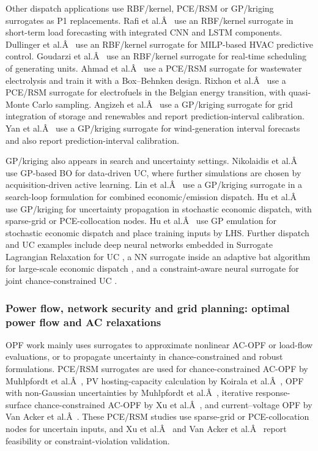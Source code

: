 \documentclass[final,5p,times,twocolumn]{elsarticle}
\begin{document}
Other dispatch applications use RBF/kernel, PCE/RSM or GP/kriging
surrogates as P1 replacements. Rafi et al.Â~\cite{Rafi202132436} use an
RBF/kernel surrogate in short-term load forecasting with integrated CNN
and LSTM components. Dullinger et al.Â~\cite{Dullinger20181646} use an
RBF/kernel surrogate for MILP-based HVAC predictive control. Goudarzi et
al.Â~\cite{Goudarzi2017667} use an RBF/kernel surrogate for real-time
scheduling of generating units. Ahmad et al.Â~\cite{Ahmad202451} use a
PCE/RSM surrogate for wastewater electrolysis and train it with a
Box--Behnken design. Rixhon et al.Â~\cite{Rixhon2021} use a PCE/RSM surrogate
for electrofuels in the Belgian energy transition, with quasi-Monte
Carlo sampling. Angizeh et al.Â~\cite{Angizeh2023134995} use a GP/kriging
surrogate for grid integration of storage and renewables and report
prediction-interval calibration. Yan et al.Â~\cite{Yan2019625} use a
GP/kriging surrogate for wind-generation interval forecasts and also
report prediction-interval calibration.

GP/kriging also appears in search and uncertainty settings. Nikolaidis
et al.Â~\cite{Nikolaidis2021} use GP-based BO for data-driven UC, where
further simulations are chosen by acquisition-driven active learning.
Lin et al.Â~\cite{Lin2023} use a GP/kriging surrogate in a search-loop
formulation for combined economic/emission dispatch. Hu et
al.Â~\cite{Hu2021671} use GP/kriging for uncertainty propagation in
stochastic economic dispatch, with sparse-grid or PCE-collocation nodes.
Hu et al.Â~\cite{Hu2020} use GP emulation for stochastic economic dispatch
and place training inputs by LHS. Further dispatch and UC examples
include deep neural networks embedded in Surrogate Lagrangian
Relaxation for UC \cite{Wu2024391}, a NN surrogate inside an
adaptive bat algorithm for large-scale economic dispatch \cite{Pang2023},
and a constraint-aware neural surrogate for joint chance-constrained UC
\cite{Liang20246508}.

\subsubsection{Power flow, network security and grid planning: optimal power flow and AC relaxations}
\label{sec:apps:opf}

OPF work mainly uses surrogates to approximate nonlinear AC-OPF or
load-flow evaluations, or to propagate uncertainty in chance-constrained
and robust formulations. PCE/RSM surrogates are used for
chance-constrained AC-OPF by Muhlpfordt et al.Â~\cite{Muhlpfordt20194806}, PV
hosting-capacity calculation by Koirala et al.Â~\cite{Koirala20242284}, OPF
with non-Gaussian uncertainties by Muhlpfordt et
al.Â~\cite{Muhlpfordt20174490}, iterative response-surface chance-constrained
AC-OPF by Xu et al.Â~\cite{Xu20212696}, and current--voltage OPF by Van Acker
et al.Â~\cite{Van Acker2022}. These PCE/RSM studies use sparse-grid or
PCE-collocation nodes for uncertain inputs, and Xu et al.Â~\cite{Xu20212696}
and Van Acker et al.Â~\cite{Van Acker2022} report feasibility or
constraint-violation validation.
\end{document}
